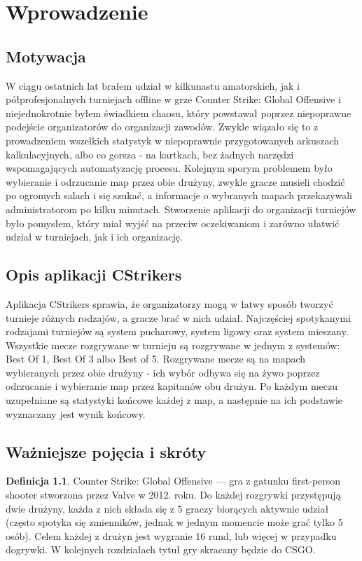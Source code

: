 \documentclass[shortabstract]{iithesis}
\author         {Tomasz Woszczyński}
\theoremstyle{definition} \newtheorem{definition}{Definicja}[]
\theoremstyle{remark} \newtheorem{remark}[definition]{Observation}
\theoremstyle{plain} \newtheorem{theorem}[definition]{Theorem}
\theoremstyle{plain} \newtheorem{lemma}[definition]{Lemma}
\begin{document}

\chapter{Wprowadzenie}
\section{Motywacja}
W ciągu ostatnich lat brałem udział w kilkunastu amatorskich, jak i półprofesjonalnych turniejach offline w grze Counter Strike: Global Offensive i niejednokrotnie byłem świadkiem chaosu, który powstawał poprzez niepoprawne podejście organizatorów do organizacji zawodów. Zwykle wiązało się to z prowadzeniem wszelkich statystyk w niepoprawnie przygotowanych arkuszach kalkulacyjnych, albo co gorsza - na kartkach, bez żadnych narzędzi wspomagających automatyzację procesu. Kolejnym sporym problemem było wybieranie i odrzucanie map przez obie drużyny, zwykle gracze musieli chodzić po ogromych salach i się szukać, a informacje o wybranych mapach przekazywali administratorom po kilku minutach. Stworzenie aplikacji do organizacji turniejów było pomysłem, który miał wyjść na przeciw oczekiwaniom i zarówno ułatwić udział w turniejach, jak i ich organizację.

\section{Opis aplikacji CStrikers}
Aplikacja CStrikers sprawia, że organizatorzy mogą w łatwy sposób tworzyć turnieje różnych rodzajów, a gracze brać w nich udział. Najczęściej spotykanymi rodzajami turniejów są system pucharowy, system ligowy oraz system mieszany. Wszystkie mecze rozgrywane w turnieju są rozgrywane w jednym z systemów: Best Of 1, Best Of 3 albo Best of 5. Rozgrywane mecze są na mapach wybieranych przez obie drużyny - ich wybór odbywa się na żywo poprzez odrzucanie i wybieranie map przez kapitanów obu drużyn. Po każdym meczu uzupełniane są statystyki końcowe każdej z map, a następnie na ich podstawie wyznaczany jest wynik końcowy.


\section{Ważniejsze pojęcia i skróty}
\begin{definition}
    Counter Strike: Global Offensive --- gra z gatunku first-person shooter stworzona przez Valve w 2012. roku. Do każdej rozgrywki przystępują dwie drużyny, każda z nich składa się z 5 graczy biorących aktywnie udział (często spotyka się zmienników, jednak w jednym momencie może grać tylko 5 osób). Celem każdej z drużyn jest wygranie 16 rund, lub więcej w przypadku dogrywki. W kolejnych rozdziałach tytuł gry skracany będzie do CSGO.
\end{definition}
\end{document}
